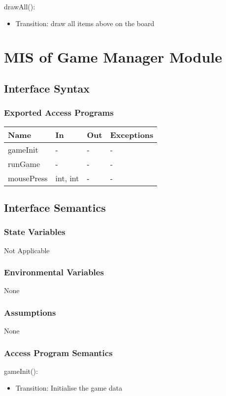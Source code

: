 \documentclass[12,english]{article}
\begin{document}
\noindent drawAll():
\begin{itemize}
    \item Transition: draw all items above on the board
\end{itemize}


\section{MIS of Game Manager Module}
\subsection{Interface Syntax}
\subsubsection{Exported Access Programs}
\begin{table}[h!]
    \centering
    \begin{tabular}{|p{4cm}|p{2cm}|p{2cm}|p{2cm}|}
    \hline
    \textbf {Name}  & {In} & {Out} & {Exceptions} \\
    \hline
    gameInit & - & - & -\\
    \hline 
    runGame & - & - & -\\
    \hline 
    mousePress & int, int & - & -\\
    \hline 
    \end{tabular}
\end{table}
\subsection{Interface Semantics}
\subsubsection{State Variables}
Not Applicable 
\subsubsection{Environmental Variables}
None
\subsubsection{Assumptions}
None
\subsubsection{Access Program Semantics}

\noindent gameInit():
\begin{itemize}
    \item Transition: Initialise the game data
\end{itemize}
\end{document}
